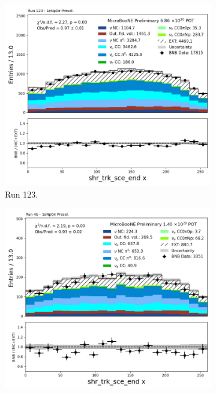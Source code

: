 \begin{figure}[H]
    \centering
    \begin{subfigure}[t]{0.32\linewidth}
        \includegraphics[width=\linewidth]{technote/Appendix_Preselection/Figures/1eNp0pi/Run123/shr_trk_sce_end_x_Run123_1eNp0pi_Presel.png}
        \caption{Run 123.}
    \end{subfigure}%
    \hspace{0.2cm}%
    \begin{subfigure}[t]{0.32\linewidth}
        \includegraphics[width=\linewidth]{technote/Appendix_Preselection/Figures/1eNp0pi/Run4b/shr_trk_sce_end_x_Run4b_1eNp0pi_Presel.png}

\end{subfigure}
\end{figure}
